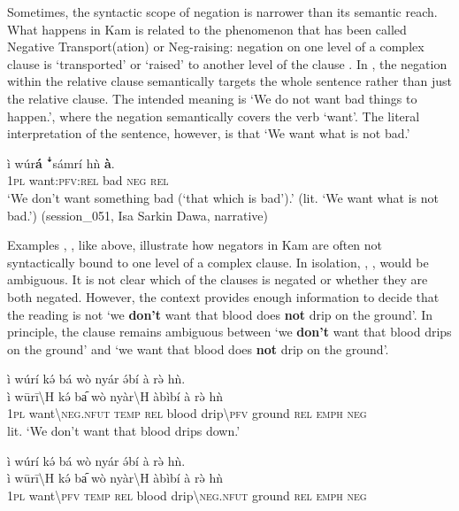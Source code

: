 \documentclass[output=paper,colorlinks,citecolor=brown]{langscibook}
\begin{document}
Sometimes, the syntactic scope of negation is narrower than its semantic reach. What happens in Kam is related to the phenomenon that has been called Negative Transport(ation) or Neg-raising: negation on one level of a complex clause is ‘transported’ or ‘raised’ to another level of the clause \citep[312--313]{Horn2001}. In , the negation within the relative clause semantically targets the whole sentence rather than just the relative clause. The intended meaning is ‘We do not want bad things to happen.’, where the negation semantically covers the verb ‘want’. The literal interpretation of the sentence, however, is that ‘We want what is not bad.’ 
    

\ea\label{ex:kam:83} 
    \gll ì wúr\textbf{á} ꜜsámrí hǹ \textbf{à}.\\
        \textsc{1pl} want:\textsc{pfv:rel} bad \textsc{neg} \textsc{rel}\\
    \glt ‘We don’t want something bad (‘that which is bad’).’ (lit. ‘We want what is not bad.’) (session\_051, Isa Sarkin Dawa, narrative)
\z 

Examples , ,  like  above, illustrate how negators in Kam are often not syntactically bound to one level of a complex clause. In isolation, , ,  would be ambiguous. It is not clear which of the clauses is negated or whether they are both negated. However, the context provides enough information to decide that the reading is not ‘we \textbf{don’t} want that blood does \textbf{not} drip on the ground’. In principle, the clause remains ambiguous between ‘we \textbf{don’t} want that blood drips on the ground’ and ‘we want that blood does \textbf{not} drip on the ground’.

\ea\label{ex:kam:84a} 
    \glll ì wúrí  kə́ bá wò nyár  ə́bí à rə̀ hǹ.\\ 
        ì wūrī{\textbackslash}H kə́ ba᷇  wò nyàr{\textbackslash}H àbìbí à rə̀ hǹ \\ 
        \textsc{1pl} {want{\textbackslash}\textsc{neg.nfut}} \textsc{temp} \textsc{rel} blood {drip{\textbackslash}\textsc{pfv}} ground \textsc{rel} \textsc{emph} \textsc{neg}\\

    \glt lit. ‘We don’t want that blood drips down.’
\z 

\ea\label{ex:kam:84b} 
    \glll ì wúrí  kə́ bá wò nyár  ə́bí à rə̀ hǹ.\\ 
        ì wūrī{\textbackslash}H kə́ ba᷇  wò nyàr{\textbackslash}H àbìbí à rə̀ hǹ \\ 
        \textsc{1pl} {want{\textbackslash}\textsc{pfv}} \textsc{temp} \textsc{rel} blood {drip{\textbackslash}\textsc{neg.nfut}} ground \textsc{rel} \textsc{emph} \textsc{neg}\\
\end{document}
